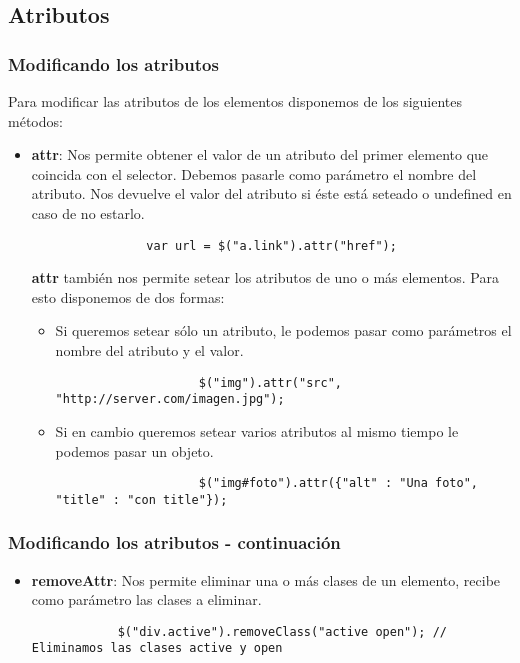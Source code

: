 \documentclass[10pt]{beamer}
\begin{document}
\subsection{Atributos}
\begin{frame}[fragile]
	\frametitle{Modificando los atributos}
	
	\pause Para modificar las atributos de los elementos disponemos de los siguientes métodos:
	
	\begin{itemize}
		\pause \item \textbf{attr}: Nos permite obtener el valor de un atributo del primer elemento que coincida con el selector.
			Debemos pasarle como parámetro el nombre del atributo. Nos devuelve el valor del atributo si éste está seteado o
			undefined en caso de no estarlo.
			\pause \begin{lstlisting}
				var url = $("a.link").attr("href");
			\end{lstlisting}
			
			\pause \textbf{attr} también nos permite setear los atributos de uno o más elementos. Para esto disponemos de dos formas:
			\begin{itemize}
				\pause \item Si queremos setear sólo un atributo, le podemos pasar como parámetros el nombre del atributo y el valor.
				\pause \begin{lstlisting}
					$("img").attr("src", "http://server.com/imagen.jpg");
				\end{lstlisting}
				
				\pause \item Si en cambio queremos setear varios atributos al mismo tiempo le podemos pasar un objeto.
				\pause \begin{lstlisting}
					$("img#foto").attr({"alt" : "Una foto", "title" : "con title"});
				\end{lstlisting}
			\end{itemize}
		\end{itemize}
\end{frame}

\begin{frame}[fragile]
	\frametitle{Modificando los atributos - continuación}
	\begin{itemize}
		\pause \item \textbf{removeAttr}: Nos permite eliminar una o más clases de un elemento, recibe como parámetro las clases a eliminar.
		\pause \begin{lstlisting}
			$("div.active").removeClass("active open"); // Eliminamos las clases active y open
		\end{lstlisting}
	\end{itemize}
\end{frame}
\end{document}
